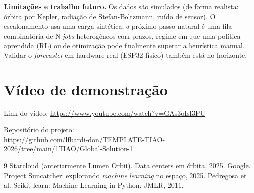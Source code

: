 \documentclass[11pt]{article}
\begin{document}
\textbf{Limita\c{c}\~oes e trabalho futuro.} Os dados s\~ao simulados (de forma realista: \'orbita por Kepler, radia\c{c}\~ao de Stefan-Boltzmann, ru\'ido de sensor). O escalonamento usa uma carga sint\'etica; o pr\'oximo passo natural \'e uma fila combinat\'oria de N \emph{jobs} heterog\^eneos com prazos, regime em que uma pol\'itica aprendida (RL) ou de otimiza\c{c}\~ao pode finalmente superar a heur\'istica manual. Validar o \emph{forecaster} em hardware real (ESP32 f\'isico) tamb\'em est\'a no horizonte.

\section*{V\'ideo de demonstra\c{c}\~ao}

\noindent
Link do v\'ideo: \href{https://www.youtube.com/watch?v=GAs3oIsI3PU}{\url{https://www.youtube.com/watch?v=GAs3oIsI3PU}}

\noindent
Reposit\'orio do projeto:\\
\href{https://github.com/lfbardi-don/TEMPLATE-TIAO-2026/tree/main/1TIAO/Global-Solution-1}{\url{https://github.com/lfbardi-don/TEMPLATE-TIAO-2026/tree/main/1TIAO/Global-Solution-1}}

\begin{thebibliography}{9}
 Starcloud (anteriormente Lumen Orbit). Data centers em \'orbita, 2025.
 Google. Project Suncatcher: explorando \emph{machine learning} no espa\c{c}o, 2025.
 Pedregosa et al. Scikit-learn: Machine Learning in Python. JMLR, 2011.
\end{thebibliography}
\end{document}
